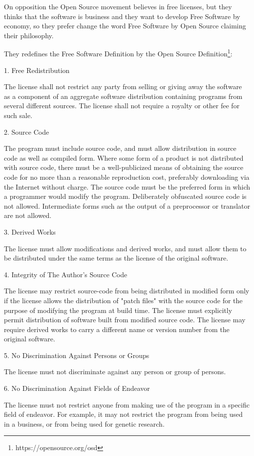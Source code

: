 \documentclass[fleqn,10pt,lineno]{wlpeerj} %
\begin{document}
On opposition the Open Source movement believes in free licenses, but
they thinks that the software is business and they want to develop
Free Software by economy, so they prefer change the word Free Software
by Open Source claiming their philosophy.

They redefines the Free Software Definition by the Open Source
Definition\footnote{https://opensource.org/osd}:

1. Free Redistribution

The license shall not restrict any party from selling or giving away
the software as a component of an aggregate software distribution
containing programs from several different sources. The license shall
not require a royalty or other fee for such sale.

2. Source Code

The program must include source code, and must allow distribution in
source code as well as compiled form. Where some form of a product is
not distributed with source code, there must be a well-publicized
means of obtaining the source code for no more than a reasonable
reproduction cost, preferably downloading via the Internet without
charge. The source code must be the preferred form in which a
programmer would modify the program. Deliberately obfuscated source
code is not allowed. Intermediate forms such as the output of a
preprocessor or translator are not allowed.

3. Derived Works

The license must allow modifications and derived works, and must allow
them to be distributed under the same terms as the license of the
original software.

4. Integrity of The Author's Source Code

The license may restrict source-code from being distributed in
modified form only if the license allows the distribution of "patch
files" with the source code for the purpose of modifying the program
at build time. The license must explicitly permit distribution of
software built from modified source code. The license may require
derived works to carry a different name or version number from the
original software.

5. No Discrimination Against Persons or Groups

The license must not discriminate against any person or group of
persons.

6. No Discrimination Against Fields of Endeavor

The license must not restrict anyone from making use of the program in
a specific field of endeavor. For example, it may not restrict the
program from being used in a business, or from being used for genetic
research.
\end{document}
